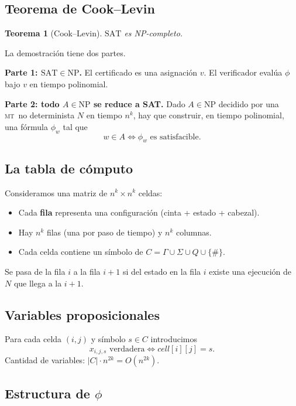 \documentclass[11pt,a4paper]{article}
\theoremstyle{definicion}
\newtheorem{teorema}[definicion]{Teorema}
\newcommand{\MT}{\textsc{mt}}
\newcommand{\NP}{\mathrm{NP}}
\begin{document}
\subsection{Teorema de Cook--Levin}

\begin{teorema}[Cook--Levin]\label{teo:cook-levin}
$\mathrm{SAT}$ es NP-completo.
\end{teorema}

La demostraci\'on tiene dos partes.

\textbf{Parte 1: $\mathrm{SAT} \in \NP$.} El certificado es una asignaci\'on $v$. El verificador eval\'ua $\phi$ bajo $v$ en tiempo polinomial.

\textbf{Parte 2: todo $A \in \NP$ se reduce a SAT.} Dado $A \in \NP$ decidido por una \MT\ no determinista $N$ en tiempo $n^k$, hay que construir, en tiempo polinomial, una f\'ormula $\phi_w$ tal que
\[
w \in A \iff \phi_w \text{ es satisfacible}.
\]

\subsection{La tabla de c\'omputo}

Consideramos una matriz de $n^k \times n^k$ celdas:
\begin{itemize}
    \item Cada \textbf{fila} representa una configuraci\'on (cinta + estado + cabezal).
    \item Hay $n^k$ filas (una por paso de tiempo) y $n^k$ columnas.
    \item Cada celda contiene un s\'imbolo de $C = \Gamma \cup \Sigma \cup Q \cup \{\#\}$.
\end{itemize}
Se pasa de la fila $i$ a la fila $i+1$ si del estado en la fila $i$ existe una ejecuci\'on de $N$ que llega a la $i+1$.

\subsection{Variables proposicionales}

Para cada celda $(i, j)$ y s\'imbolo $s \in C$ introducimos
\[
x_{i,j,s} \text{ verdadera} \iff cell[i][j] = s.
\]
Cantidad de variables: $|C| \cdot n^{2k} = O(n^{2k})$.

\subsection{Estructura de $\phi$}
\end{document}

